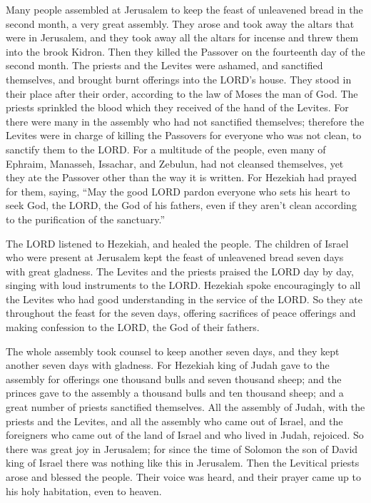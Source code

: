  Many people assembled at Jerusalem to keep the feast of
unleavened bread in the second month, a very great assembly.
 They arose and took away the altars that were in
Jerusalem, and they took away all the altars for incense and threw them
into the brook Kidron.  Then they killed the Passover on
the fourteenth day of the second month. The priests and the Levites were
ashamed, and sanctified themselves, and brought burnt offerings into the
LORD's house.  They stood in their place after their order,
according to the law of Moses the man of God. The priests sprinkled the
blood which they received of the hand of the Levites.  For
there were many in the assembly who had not sanctified themselves;
therefore the Levites were in charge of killing the Passovers for
everyone who was not clean, to sanctify them to the LORD. 
For a multitude of the people, even many of Ephraim, Manasseh, Issachar,
and Zebulun, had not cleansed themselves, yet they ate the Passover
other than the way it is written. For Hezekiah had prayed for them,
saying, ``May the good LORD pardon everyone  who sets his
heart to seek God, the LORD, the God of his fathers, even if they aren't
clean according to the purification of the sanctuary.''

 The LORD listened to Hezekiah, and healed the people.
 The children of Israel who were present at Jerusalem kept
the feast of unleavened bread seven days with great gladness. The
Levites and the priests praised the LORD day by day, singing with loud
instruments to the LORD.  Hezekiah spoke encouragingly to
all the Levites who had good understanding in the service of the LORD.
So they ate throughout the feast for the seven days, offering sacrifices
of peace offerings and making confession to the LORD, the God of their
fathers.

 The whole assembly took counsel to keep another seven
days, and they kept another seven days with gladness.  For
Hezekiah king of Judah gave to the assembly for offerings one thousand
bulls and seven thousand sheep; and the princes gave to the assembly a
thousand bulls and ten thousand sheep; and a great number of priests
sanctified themselves.  All the assembly of Judah, with the
priests and the Levites, and all the assembly who came out of Israel,
and the foreigners who came out of the land of Israel and who lived in
Judah, rejoiced.  So there was great joy in Jerusalem; for
since the time of Solomon the son of David king of Israel there was
nothing like this in Jerusalem.  Then the Levitical priests
arose and blessed the people. Their voice was heard, and their prayer
came up to his holy habitation, even to heaven.

